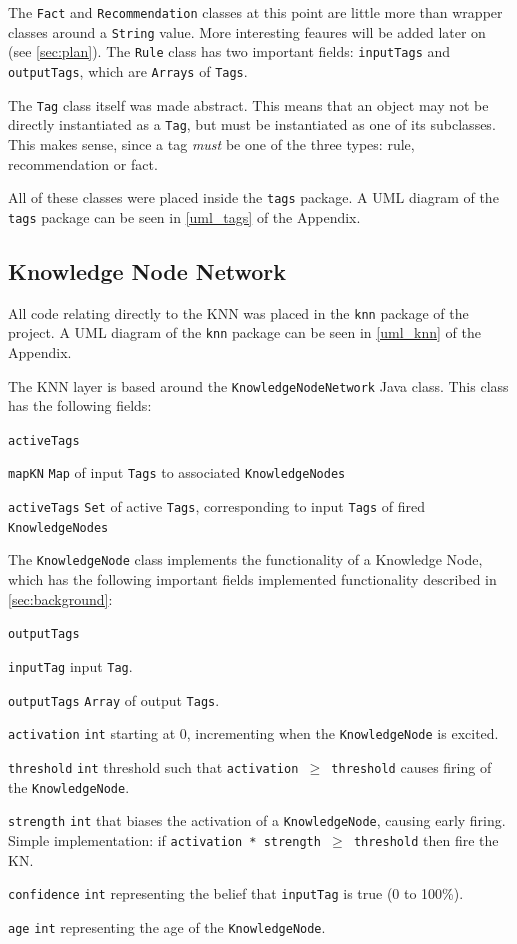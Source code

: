 \documentclass[titlepage,11pt]{article}
\newcommand{\code}[1]{\texttt{#1}}
\begin{document}
The \code{Fact} and \code{Recommendation} classes at this point are little more than wrapper classes around a \code{String} value. More interesting feaures will be added later on (see \autoref{sec:plan}). The \code{Rule} class has two important fields: \code{inputTags} and \code{outputTags}, which are \code{Arrays} of \code{Tags}.

The \code{Tag} class itself was made abstract. This means that an object may not be directly instantiated as a \code{Tag}, but must be instantiated as one of its subclasses. This makes sense, since a tag \emph{must} be one of the three types: rule, recommendation or fact.

All of these classes were placed inside the \code{tags} package. A UML diagram of the \code{tags} package can be seen in \autoref{uml_tags} of the Appendix.

\subsection{Knowledge Node Network}

All code relating directly to the KNN was placed in the \code{knn} package of the project. A UML diagram of the \code{knn} package can be seen in \autoref{uml_knn} of the Appendix.

The KNN layer is based around the \code{KnowledgeNodeNetwork} Java class. This class has the following fields:

\begin{labeling}{\code{activeTags}}
	\item[\code{mapKN}] \code{Map} of input \code{Tags} to associated \code{KnowledgeNodes}
	\item[\code{activeTags}] \code{Set} of active \code{Tags}, corresponding to input \code{Tags} of fired \code{KnowledgeNodes}
\end{labeling}

The \code{KnowledgeNode} class implements the functionality of a Knowledge Node, which has the following important fields implemented functionality described in \autoref{sec:background}:

\begin{labeling}{\code{outputTags}}
	\item[\code{inputTag}] input \code{Tag}.
	\item[\code{outputTags}] \code{Array} of output \code{Tags}.
	\item[\code{activation}] \code{int} starting at 0, incrementing when the \code{KnowledgeNode} is excited.
	\item[\code{threshold}] \code{int} threshold such that \code{activation $\geq$ threshold} causes firing of the \code{KnowledgeNode}.
	\item[\code{strength}] \code{int} that biases the activation of a \code{KnowledgeNode}, causing early firing. Simple implementation: if \code{activation * strength $\geq$ threshold} then fire the KN.
	\item[\code{confidence}] \code{int} representing the belief that \code{inputTag} is true (0 to 100\%).
	\item[\code{age}] \code{int} representing the age of the \code{KnowledgeNode}.
\end{labeling}
\end{document}
